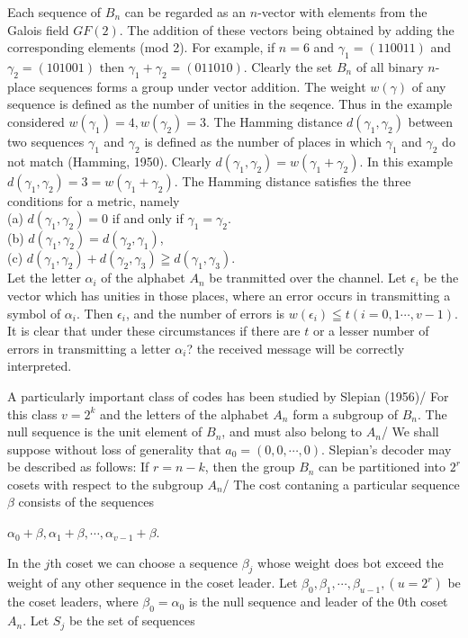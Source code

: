 \documentclass{article}
\begin{document}
Each sequence of $B_n$ can be regarded as an $n$-vector with elements from the Galois field $GF(2)$. The addition of these vectors being obtained by adding the corresponding elements (mod 2). For example, if $n=6$ and $\gamma_1=(110011)$ and $\gamma_2=(101001)$ then $\gamma_1+\gamma_2=(011010)$. Clearly the set $B_n$ of all binary $n$-place sequences forms a group under vector addition. The weight $w(\gamma)$ of any sequence is defined as the number of unities in the seqence. Thus in the example considered $w(\gamma_1)=4, w(\gamma_2)=3$. The Hamming distance $d(\gamma_1, \gamma_2)$ between two sequences $\gamma_1$ and $\gamma_2$ is defined as the number of places in which $\gamma_1$ and $\gamma_2$ do not match (Hamming, 1950). Clearly $d(\gamma_1, \gamma_2)=w(\gamma_1+\gamma_2)$. In this example $d(\gamma_1, \gamma_2)=3=w(\gamma_1+\gamma_2)$. The Hamming distance satisfies the three conditions for a metric, namely\\
(a) $d(\gamma_1, \gamma_2)=0$ if and only if $\gamma_1=\gamma_2$.\\
(b) $d(\gamma_1, \gamma_2)=d(\gamma_2, \gamma_1)$,\\
(c) $d(\gamma_1, \gamma_2)+d(\gamma_2, \gamma_3) \geqq d(\gamma_1, \gamma_3)$.\\

Let the letter $\alpha_i$ of the alphabet $A_n$ be tranmitted over the channel. Let $\epsilon_i$ be the vector which has unities in those places, where an error occurs in transmitting a symbol of $\alpha_i$. Then $\epsilon_i$, and the number of errors is $w(\epsilon_i)\leqq t(i=0,1\cdots,v-1)$. It is clear that under these circumstances if there are $t$ or a lesser number of errors in transmitting a letter $\alpha_i$? the received message will be correctly interpreted.

A particularly important class of codes has been studied by Slepian (1956)/ For this class $v=2^k$ and the letters of the alphabet $A_n$ form a subgroup of $B_n$. The null sequence is the unit element of $B_n$, and must also belong to $A_n$/ We shall suppose without loss of generality that $a_0=(0,0,\cdots,0)$. Slepian's decoder may be described as follows: If $r=n-k$, then the group $B_n$ can be partitioned into $2^r$ cosets with respect to the subgroup $A_n$/ The cost contaning a particular sequence $\beta$ consists of the sequences 

$\alpha_0+\beta,\alpha_1+\beta,\cdots,\alpha_{v-1}+\beta$.

In the $j$th coset we can choose a sequence $\beta_j$ whose weight does bot exceed the weight of any other sequence in the coset leader. Let $\beta_0,\beta_1,\cdots,\beta_{u-1},(u=2^r)$ be the coset leaders, where $\beta_0=\alpha_0$ is the null sequence and leader of the 0th coset $A_n$. Let $S_j$ be the set of sequences
\end{document}

